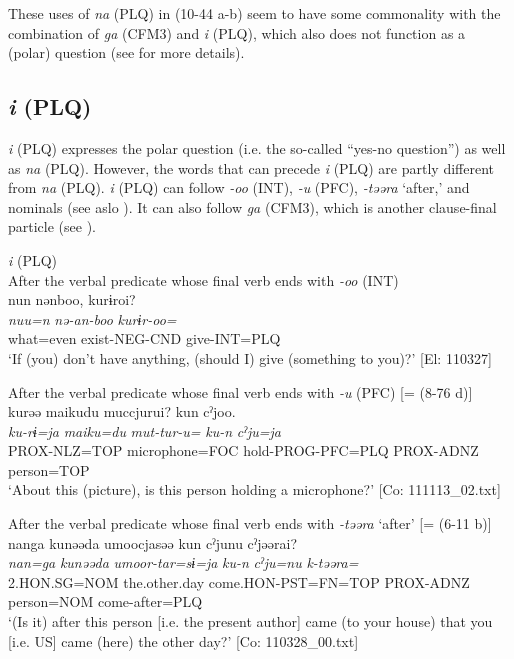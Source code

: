 These uses of \textit{na} (PLQ) in (10-44 a-b) seem to have some commonality with the combination of \textit{ga} (CFM3) and \textit{i} (PLQ), which also does not function as a (polar) question (see  for more details).

\subsection{\textit{i} (PLQ)}\label{sec:10.3.3}

\textit{i} (PLQ) expresses the polar question (i.e. the so-called “yes-no question”) as well as \textit{na} (PLQ). However, the words that can precede \textit{i} (PLQ) are partly different from \textit{na} (PLQ). \textit{i} (PLQ) can follow \textit{{}-oo} (INT), \textit{{}-u} (PFC), \textit{{}-təəra} ‘after,’ and nominals (see aslo ). It can also follow \textit{ga} (CFM3), which is another clause-final particle (see ).

\ea\label{ex:10.45}   \textit{i} (PLQ)\\
  \ea After the verbal predicate whose final verb ends with \textit{-oo} (INT)\\
      \glll    nun  nənboo,  kurɨroi?\\
    \textit{nuu=n}  \textit{nə-an-boo}  \textit{kurɨr-oo=}\\
    what=even  exist-NEG-CND  give-INT=PLQ\\
    \glt     ‘If (you) don’t have anything, (should I) give (something to you)?’ [El: 110327]

  \ex After the verbal predicate whose final verb ends with \textit{-u} (PFC) [= (8-76 d)]\\
      \glll    kurəə  {\textbar}maiku{\textbar}du  muccjurui? kun  cˀjoo.\\                                                               
    \textit{ku-rɨ=ja}  \textit{maiku=du}  \textit{mut-tur-u=}  \textit{ku-n}  \textit{cˀju=ja}\\                                                               
    PROX-NLZ=TOP  microphone=FOC  hold-PROG-PFC=PLQ  PROX-ADNZ  person=TOP \\
    \glt ‘About this (picture), is this person holding a microphone?’ [Co: 111113\_02.txt]

  \ex After the verbal predicate whose final verb ends with \textit{{}-təəra} ‘after’ [= (6-11 b)]\\
      \glll    nanga  kunəəda  umoocjasəə  kun   cˀjunu  cˀjəərai?\\
    \textit{nan=ga}  \textit{kunəəda}  \textit{umoor-tar=sɨ=ja}  \textit{ku-n}  \textit{cˀju=nu}  \textit{k-təəra=}\\
    2.HON.SG=NOM  the.other.day  come.HON-PST=FN=TOP  PROX-ADNZ   person=NOM  come-after=PLQ\\
\glt     ‘(Is it) after this person [i.e. the present author] came (to your house) that you [i.e. US] came (here) the other day?’  [Co: 110328\_00.txt]

